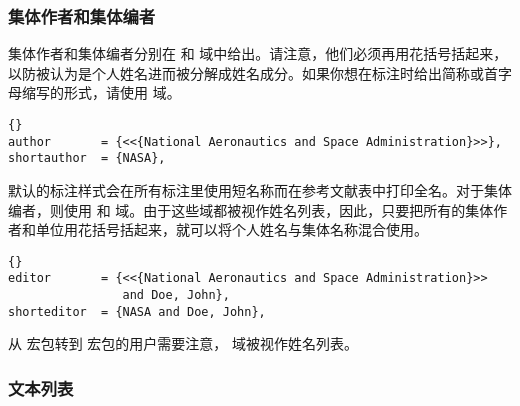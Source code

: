 \subsubsection{集体作者和集体编者}
\label{bib:use:inc}


集体作者和集体编者分别在  和  域中给出。请注意，他们必须再用花括号括起来，以防被认为是个人姓名进而被分解成姓名成分。如果你想在标注时给出简称或首字母缩写的形式，请使用  域。

\begin{lstlisting}[style=bibtex]{}
author       = {<<{National Aeronautics and Space Administration}>>},
shortauthor  = {NASA},
\end{lstlisting}
%
默认的标注样式会在所有标注里使用短名称而在参考文献表中打印全名。对于集体编者，则使用  和  域。由于这些域都被视作姓名列表，因此，只要把所有的集体作者和单位用花括号括起来，就可以将个人姓名与集体名称混合使用。

\begin{lstlisting}[style=bibtex]{}
editor       = {<<{National Aeronautics and Space Administration}>>
                and Doe, John},
shorteditor  = {NASA and Doe, John},
\end{lstlisting}
%
从  宏包转到 \biblatex 宏包的用户需要注意， 域被视作姓名列表。

\subsubsection{文本列表}%
\label{bib:use:and}

